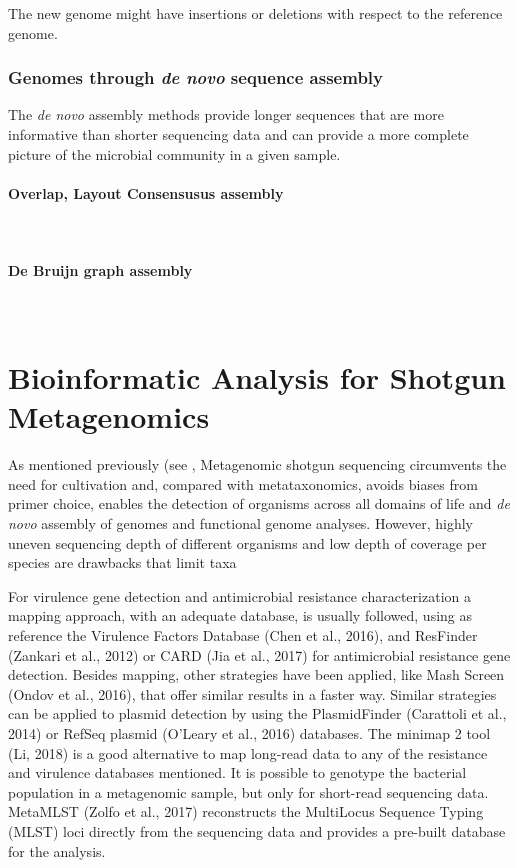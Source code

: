 The new genome might have insertions or deletions with respect to the reference genome.

\subsubsection{Genomes through \textit{de novo} sequence assembly}

The \textit{de novo} assembly methods provide longer sequences that are more informative than shorter sequencing data and can provide a more complete picture of the microbial community in a given sample.

\paragraph{Overlap, Layout Consensusus assembly} \label{sssec:OLC_assembly} \mbox{}\\

\paragraph{De Bruijn graph assembly} \label{sssec:dbg_assembly} \mbox{}\\


\section{Bioinformatic Analysis for Shotgun Metagenomics}

As mentioned previously (see , Metagenomic shotgun sequencing circumvents the need for cultivation and, compared with metataxonomics, avoids biases from primer choice, enables the detection of organisms across all domains of life and \textit{de novo} assembly of genomes and functional genome analyses. However, highly uneven sequencing depth of different organisms and low depth of coverage per species are drawbacks that limit taxa





For virulence gene detection and antimicrobial resistance characterization a mapping approach, with an adequate database, is usually followed, using as reference the Virulence Factors Database (Chen et al., 2016), and ResFinder (Zankari et al., 2012) or CARD (Jia et al., 2017) for antimicrobial resistance gene detection. Besides mapping, other strategies have been applied, like Mash Screen (Ondov et al., 2016), that offer similar results in a faster way.  Similar strategies can be applied to plasmid detection by using the PlasmidFinder (Carattoli et al., 2014) or RefSeq plasmid (O’Leary et al., 2016) databases. The minimap 2 tool (Li, 2018) is a good alternative to map long-read data to any of the resistance and virulence databases mentioned. 
It is possible to genotype the bacterial population in a metagenomic sample, but only for short-read sequencing data.  MetaMLST (Zolfo et al., 2017) reconstructs the MultiLocus Sequence Typing (MLST) loci directly from the sequencing data and provides a pre-built database for the analysis.


